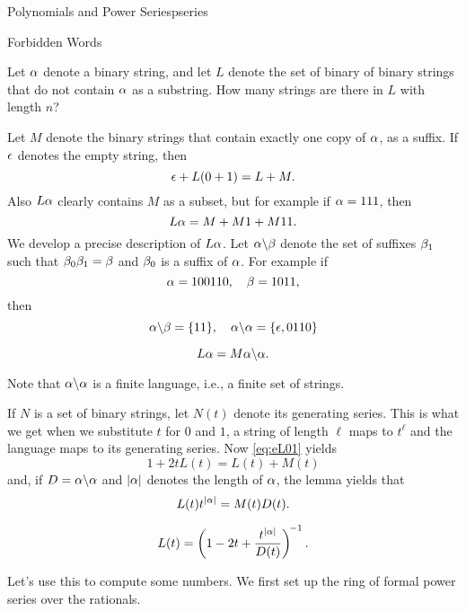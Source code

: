 \begin{chap}{Polynomials and Power Series}{pseries}
%
\begin{sect}{Forbidden Words}
%
\begin{para}
Let $\alpha$ denote a binary string, and let $L$ denote
the set of binary of binary strings that do not contain $\alpha$ as a substring. 
How many strings are there in $L$ with length $n$?
\end{para}
%
\begin{para}
Let $M$ denote the binary
strings that contain exactly one copy of $\alpha$, as a suffix. 
If $\epsilon$ denotes the empty string, then
\begin{equation}
    \label{eq:eL01}
    \epsilon+L(0+1) = L+M.
\end{equation}
Also $L\alpha$ clearly contains $M$ as a subset, but for example if $\alpha=111$,
then
\[
    L\alpha =M+M1+M11.
\]
We develop a precise description of $L\alpha$. Let $\alpha\backslash\beta$ denote the 
set of suffixes $\beta_1$ such that
$\beta_0\beta_1=\beta$ and $\beta_0$ is a suffix of $\alpha$. For example if
\[
    \alpha =100110,\quad \beta=1011,
\]
then
\[
    \alpha\backslash\beta = \{11\},\quad \alpha\backslash\alpha = \{\epsilon,0110\}
\]
%
\begin{lemma}
    \[
        L\alpha = M\alpha\backslash\alpha.
    \]
\end{lemma}
\end{para}
%
\begin{para}
Note that $\alpha\backslash\alpha$ is a finite language, i.e., a finite set of strings.
\end{para}
%
\begin{para}
If $N$ is a set of binary strings, let $N(t)$ denote its generating series.
This is what we get when we substitute $t$ for $0$ and $1$, a string of length
$\ell$ maps to $t^\ell$ and the language maps to its generating series.
Now \eqref{eq:eL01} yields
\[
    1+2t L(t) = L(t)+M(t)
\]
and, if $D=\alpha\backslash\alpha$ and $|\alpha|$ denotes the length of $\alpha$, 
the lemma yields that
\[
    L(t)t^{|\alpha|} = M(t) D(t).
\]
%
\begin{lemma}
    \[
        L(t) =\left(1-2t+\frac{t^{|\alpha|}}{D(t)}\right)^{\!-1}.
    \]
\end{lemma}
\end{para}
%
\begin{para}
Let's use this to compute some numbers. We first set up the ring of formal
power series over the rationals.
\end{para}
%
\begin{sagecode}
\begin{sageinput}

\end{sageinput}
\end{sagecode}
\end{sect}
\end{chap}
